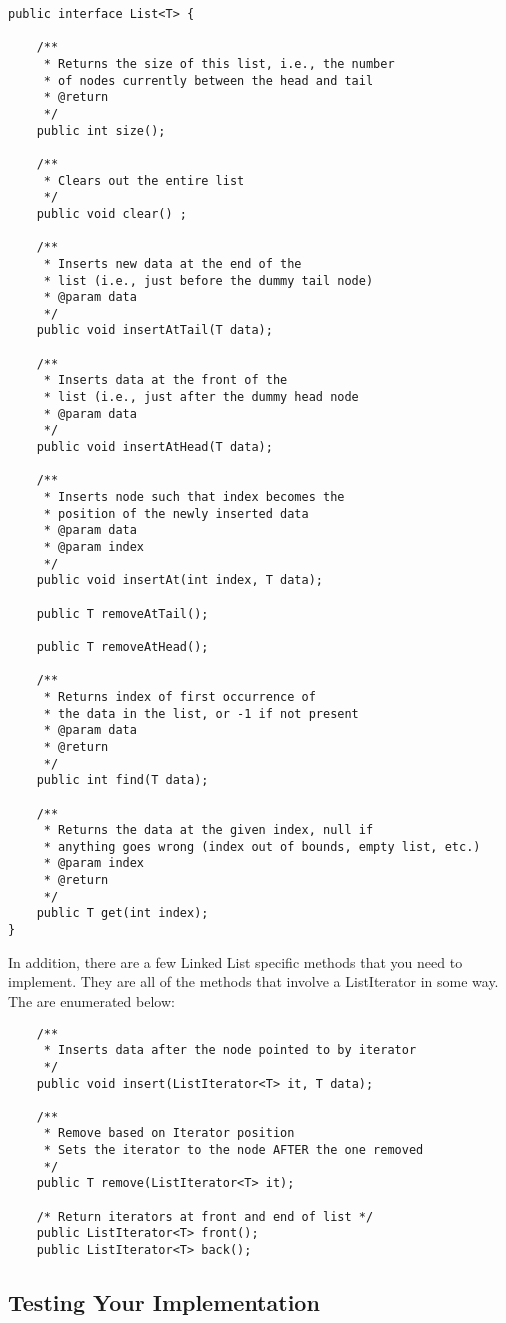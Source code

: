 \documentclass[paper=a4, fontsize=11pt, parskip=full]{scrartcl} %
\numberwithin{equation}{section} %
\numberwithin{figure}{section} %
\numberwithin{table}{section} %
\begin{document}
\begin{lstlisting}
public interface List<T> {

	/**
	 * Returns the size of this list, i.e., the number
	 * of nodes currently between the head and tail
	 * @return
	 */
	public int size();

	/**
	 * Clears out the entire list
	 */
	public void clear() ;

	/**
	 * Inserts new data at the end of the
	 * list (i.e., just before the dummy tail node)
	 * @param data
	 */
	public void insertAtTail(T data);

	/**
	 * Inserts data at the front of the
	 * list (i.e., just after the dummy head node
	 * @param data
	 */
	public void insertAtHead(T data);

	/**
	 * Inserts node such that index becomes the
	 * position of the newly inserted data
	 * @param data
	 * @param index
	 */
	public void insertAt(int index, T data);

	public T removeAtTail();

	public T removeAtHead();

	/**
	 * Returns index of first occurrence of
	 * the data in the list, or -1 if not present
	 * @param data
	 * @return
	 */
	public int find(T data);

	/**
	 * Returns the data at the given index, null if
	 * anything goes wrong (index out of bounds, empty list, etc.)
	 * @param index
	 * @return
	 */
	public T get(int index);
}
\end{lstlisting}

In addition, there are a few Linked List specific methods that you need to implement. They are all of the methods that involve a ListIterator in some way. The are enumerated below:

\begin{lstlisting}
	/**
	 * Inserts data after the node pointed to by iterator
	 */
	public void insert(ListIterator<T> it, T data);

	/**
	 * Remove based on Iterator position
	 * Sets the iterator to the node AFTER the one removed
	 */
	public T remove(ListIterator<T> it);

	/* Return iterators at front and end of list */
	public ListIterator<T> front();
	public ListIterator<T> back();
\end{lstlisting}

\subsection{Testing Your Implementation}
\end{document}
